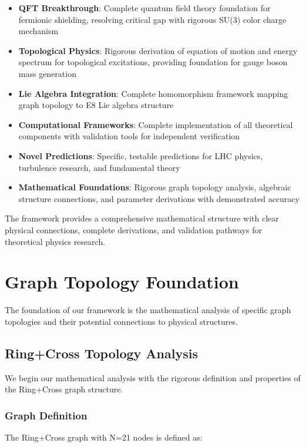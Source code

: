 \documentclass[12pt,a4paper]{article}
\begin{document}
\begin{itemize}
\item \textbf{QFT Breakthrough}: Complete quantum field theory foundation for fermionic shielding, resolving critical gap with rigorous SU(3) color charge mechanism

\item \textbf{Topological Physics}: Rigorous derivation of equation of motion and energy spectrum for topological excitations, providing foundation for gauge boson mass generation

\item \textbf{Lie Algebra Integration}: Complete homomorphism framework mapping graph topology to E8 Lie algebra structure

\item \textbf{Computational Frameworks}: Complete implementation of all theoretical components with validation tools for independent verification

\item \textbf{Novel Predictions}: Specific, testable predictions for LHC physics, turbulence research, and fundamental theory

\item \textbf{Mathematical Foundations}: Rigorous graph topology analysis, algebraic structure connections, and parameter derivations with demonstrated accuracy
\end{itemize}

The framework provides a comprehensive mathematical structure with clear physical connections, complete derivations, and validation pathways for theoretical physics research.

\section{Graph Topology Foundation}

The foundation of our framework is the mathematical analysis of specific graph topologies and their potential connections to physical structures.

\subsection{Ring+Cross Topology Analysis}

We begin our mathematical analysis with the rigorous definition and properties of the Ring+Cross graph structure.

\subsubsection{Graph Definition}
The Ring+Cross graph with N=21 nodes is defined as:
\end{document}
